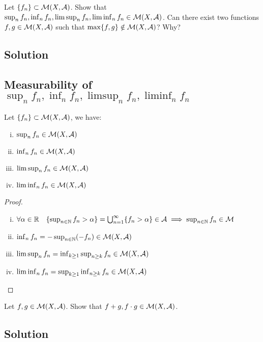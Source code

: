 
\question

Let $\{f_n\} \subset \mathcal{M}(X, \mathcal{A})$. Show that $\sup_n f_n, \inf_n f_n, \limsup_n f_n, \liminf_n f_n \in \mathcal{M}(X, \mathcal{A})$. Can there exist two functions $f, g \in \mathcal{M}(X, \mathcal{A})$ such that $\max\{f, g\} \notin \mathcal{M}(X, \mathcal{A})$? Why?

\subsection*{Solution}

\subsection{Measurability of \texorpdfstring{$\sup_n f_n, \inf_n f_n, \limsup_n f_n, \liminf_n f_n$}{sup fn, inf fn, limsup fn, liminf fn}} \label{meas:extremes}
Let $\{f_n\} \subset \mathcal{M}(X, \mathcal{A})$, we have:
\begin{enumerate}[i)]
    \item $\sup_n f_n \in \mathcal{M}(X, \mathcal{A})$
    \item $\inf_n f_n \in \mathcal{M}(X, \mathcal{A})$
    \item $\limsup_n f_n \in \mathcal{M}(X, \mathcal{A})$
    \item $\liminf_n f_n \in \mathcal{M}(X, \mathcal{A})$
\end{enumerate}

\begin{proof}
    \hspace*{\fill} %
    \begin{enumerate} [i)]
        \item $\forall \alpha \in \mathbb{R} \quad \{ \sup_{n\in\mathbb{N}} f_n > \alpha \} = \bigcup_{n=1}^\infty \{ f_n > \alpha \} \in \mathcal{A} \implies \sup_{n\in\mathbb{N}} f_n \in \mathcal{M}$
        \item $\inf_n f_n = - \sup_{n\in\mathbb{N}} (-f_n) \in \mathcal{M}(X,\mathcal{A})$
        \item $\limsup_n f_n = \inf_{k\geq 1} \sup_{n \geq k} f_n \in \mathcal{M}(X, \mathcal{A})$
        \item $\liminf_n f_n = \sup_{k\geq 1} \inf_{n\geq k} f_n \in \mathcal{M}(X, \mathcal{A})$
    \end{enumerate}
\end{proof}


\question

Let $f, g \in \mathcal{M}(X, \mathcal{A})$. Show that $f + g, f\cdot g \in \mathcal{M}(X, \mathcal{A})$.

\subsection*{Solution}


